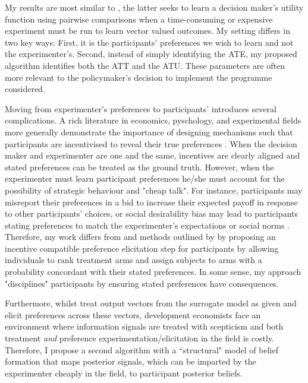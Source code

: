 \documentclass[twoside,11pt]{article}
\begin{document}
My results are most similar to \citep{dewancker2016a,lin2022preference}, the latter seeks 
to learn a decision maker's utility function using pairwise comparisons when a 
time-consuming or expensive experiment must be run to learn 
vector valued outcomes. My setting differs in two key ways: First, it is the 
participants' preferences we wish to learn and not the experimenter's. Second, 
instead of simply identifying the ATE, my proposed algorithm identifies both 
the ATT and the ATU. These parameters are often more relevant to the policymaker's 
decision to implement the programme considered.


Moving from experimenter's preferences to participants' introduces several 
complications. A rich literature in economics, pyschology, and experimental fields 
more generally demonstrate 
the importance of designing mechanisms such that participants are incentivised 
to reveal their true preferences \citep{Savage1971,ar-delavande}. When the decision maker and experimenter are 
one and the same, 
incentives are clearly aligned and stated preferences can be treated as the ground 
truth. However, when the experimenter must learn participant 
preferences he/she must account for the possibility of strategic behaviour and 
"cheap talk". For instance, participants may misreport their preferences in a bid
to increase their expected payoff in response to other participants' choices, or 
social desirability bias may lead to participants stating preferences to match 
the experimenter's expectations or social norms \citep{brownback2018a}. Therefore, my work 
differs from \cite{lin2022preference} and methods outlined by \citep{furnkranz2010a} by proposing 
an incentive compatible 
preference elicitation step for participants by allowing individuals
to rank treatment arms and assign subjects to arms with a probability
concordant with their stated preferences. In some sense, my approach "disciplines"
participants by ensuring stated preferences have consequences.


Furthermore, whilst \cite{lin2022preference} treat output vectors from the surrogate 
model as given and elicit preferences across these vectors, development economists 
face an environment where information signals are treated with 
scepticism and both treatment \textit{and} preference experimentation/elicitation
 in the field is costly. Therefore, I propose a second algorithm with a ``structural" 
 model of belief formation that maps posterior signals, which can be imparted by 
 the experimenter cheaply in the field, to participant posterior beliefs.
\end{document}
